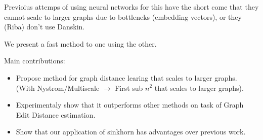 Previoius attemps of using neural networks for this have the short come that they cannot scale to larger graphs due to bottleneks (embedding vectors), or they (Riba) don't use Danskin.

We present a fast method to one using the other.

Main contributions:
\begin{itemize}
    \item Propose method for graph distance learing that scales to larger graphs. \\ (With Nystrom/Multiscale $\rightarrow$ First sub $n^2$ that scales to larger graphs).
    \item Experimentaly show that it outperforms other methods on task of Graph Edit Distance estimation.
    \item Show that our application of sinkhorn has advantages over previous work.
\end{itemize}
